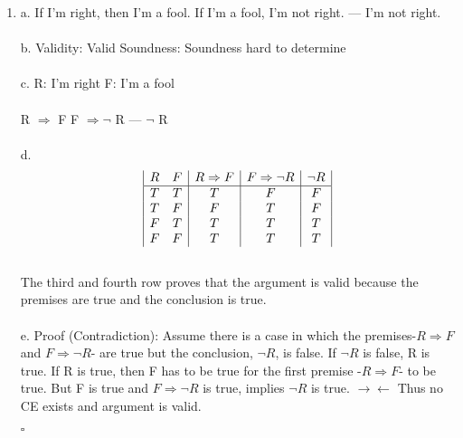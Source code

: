 \documentclass[]{article}
\begin{document}
\begin{enumerate}
    \item a.
    \newline If I'm right, then I'm a fool.
    \newline
    If I'm a fool, I'm not right.
    \newline
    ---
    \newline
    I'm not right.
    \\\\b.
    Validity: Valid
    \newline
    Soundness: Soundness hard to determine
    \\\\c.
    \newline R: I'm right
    \newline F: I'm a fool
    \\\\ R $\Rightarrow$ F
    \newline F $\Rightarrow \neg$ R
    \newline ---
    \newline $\neg$ R
    \\\\d.
    \begin{displaymath}
    \begin{array}{|c c|c|c|c|}
    R & F & R \Rightarrow F & F \Rightarrow \neg R & \neg R\\ %
    \hline %
    T & T & T & F & F\\
    T & F & F & T & F\\
    F & T & T & T & T\\
    F & F & T & T & T\\
    \end{array}
    \end{displaymath}
    \\The third and fourth row proves that the argument is valid because the premises are true and the conclusion is true.
    \\\\e.
    \newline Proof (Contradiction):
    \newline Assume there is a case in which the premises-$R \Rightarrow F$ and $F \Rightarrow \neg R$- are true but the conclusion, $\neg R$, is false. If $\neg R$ is false, R is true. If R is true, then F has to be true for the first premise -$R \Rightarrow F$- to be true. But F is true and $F \Rightarrow \neg R$ is true, implies $\neg R$ is true. $\to\gets$ Thus no CE exists and argument is valid.
    \begin{flushright}
    $\square$
    \end{flushright}
    

\end{enumerate}
\end{document}
